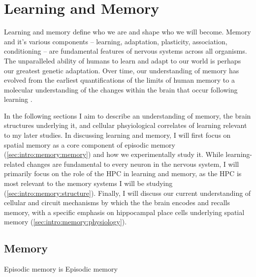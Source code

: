 \acresetall
\chapter{Learning and Memory}
\label{ch:intro:memory}
Learning and memory define who we are and shape who we will become.
Memory and it's various components -- learning, adaptation, plasticity, association, conditioning -- are fundamental features of nervous systems across all organisms.
The unparalleled ability of humans to learn and adapt to our world is perhaps our greatest genetic adaptation.
Over time, our understanding of memory has evolved from the earliest quantifications of the limits of human memory \citep{Ebbinghaus1885} to a molecular understanding of the changes within the brain that occur following learning \citep{Kandel2001}.

In the following sections I aim to describe an understanding of memory, the brain structures underlying it, and cellular phsyiological correlates of learning relevant to my later studies.
In discussing learning and memory, I will first focus on spatial memory as a core component of episodic memory (\ref{sec:intro:memory:memory}) and how we experimentally study it.
While learning-related changes are fundamental to every neuron in the nervous system, I will primarily focus on the role of the \ac{HPC} in learning and memory, as the \ac{HPC} is most relevant to the memory systems I will be studying (\ref{sec:intro:memory:structure}).
Finally, I will discuss our current understanding of cellular and circuit mechanisms by which the the brain encodes and recalls memory, with a specific emphasis on hippocampal place cells underlying spatial memory (\ref{sec:intro:memory:physiology}).

\section{Memory}






Episodic memory is 
Episodic memory \citep{Tulving1972}

